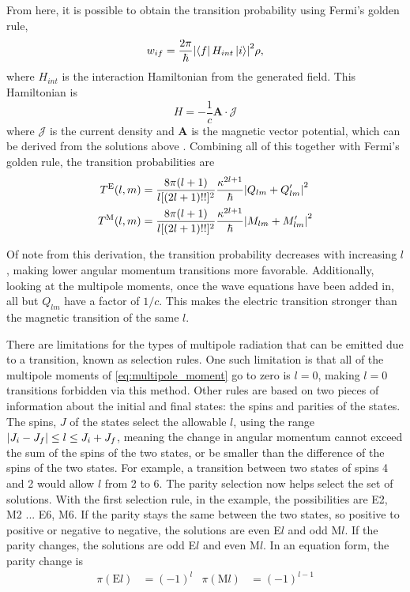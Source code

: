 From here, it is possible to obtain the transition probability using Fermi's golden rule,
\begin{equation}
    \label{eq:golden}
    w_{if}=\frac{2\pi}{\hbar}\abs{\bra{f}H_{int}\ket{i}}^2\rho,
\end{equation}
where $H_{int}$ is the interaction Hamiltonian from the generated field. This Hamiltonian is
\begin{equation}
    H = -\frac{1}{c}\boldsymbol{A}\cdot\mathcal{J}
\end{equation}
where $\mathcal{J}$ is the current density and $\boldsymbol{A}$ is the magnetic vector potential, which can be derived from the solutions above \citep{wong90:_nuclear}. Combining all of this together with Fermi's golden rule, the transition probabilities are
\begin{subequations}
\begin{align}
    T^\text{E}(l,m) & = \frac{8\pi(l+1)}{l[(2l+1)!!]^2}\frac{\kappa^{2l+1}}{\hbar}\abs{Q_{lm}+Q'_{lm}}^2 \\
    T^\text{M}(l,m) & = \frac{8\pi(l+1)}{l[(2l+1)!!]^2}\frac{\kappa^{2l+1}}{\hbar}\abs{M_{lm}+M'_{lm}}^2
\end{align}
\end{subequations}

Of note from this derivation, the transition probability decreases with increasing $l$, making lower angular momentum transitions more favorable. Additionally, looking at the multipole moments, once the wave equations have been added in, all but $Q_{lm}$ have a factor of $1/c$. This makes the electric transition stronger than the magnetic transition of the same $l$.

There are limitations for the types of multipole radiation that can be emitted due to a transition, known as selection rules. One such limitation is that all of the multipole moments of \ref{eq:multipole_moment} go to zero is $l=0$, making $l=0$ transitions forbidden via this method. Other rules are based on two pieces of information about the initial and final states: the spins and parities of the states. The spins, $J$ of the states select the allowable $l$, using the range $\abs{J_i-J_f}\leq l\leq J_i+J_f$, meaning the change in angular momentum cannot exceed the sum of the spins of the two states, or be smaller than the difference of the spins of the two states. For example, a transition between two states of spins 4 and 2 would allow $l$ from 2 to 6. The parity selection now helps select the set of solutions. With the first selection rule, in the example, the possibilities are E2, M2 ... E6, M6. If the parity stays the same between the two states, so positive to positive or negative to negative, the solutions are even E$l$ and odd M$l$. If the parity changes, the solutions are odd E$l$ and even M$l$. In an equation form, the parity change is
\begin{align}
    \pi(\text{E}l) &= (-1)^{l} & \pi(\text{M}l) &= (-1)^{l-1}
\end{align}

